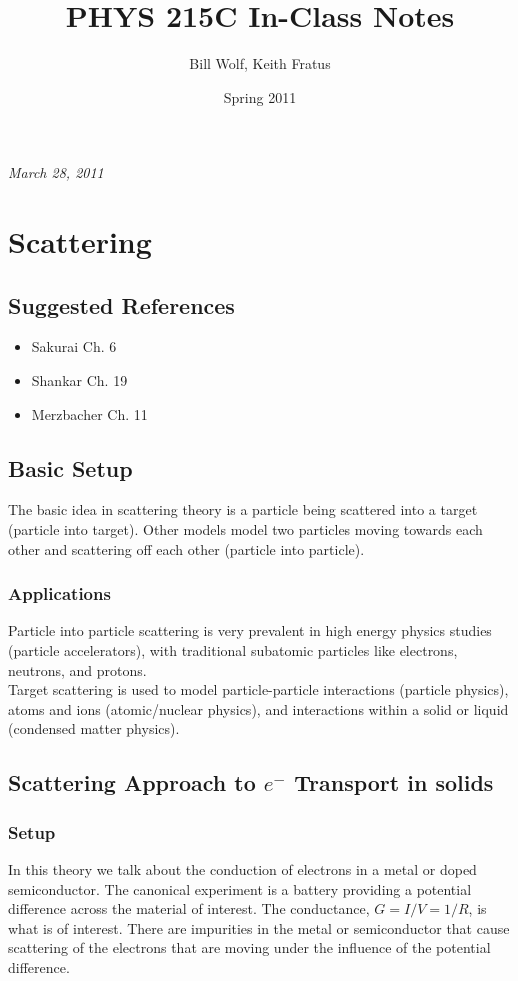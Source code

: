 \documentclass{article}
\title{PHYS 215C In-Class Notes}
\author{Bill Wolf, Keith Fratus}
\date{Spring 2011}
\begin{document}
\maketitle \newpage{}
\tableofcontents
 \newpage{}
		\textit{March 28, 2011}	
	\section{Scattering}
		\subsection{Suggested References}
		\begin{itemize}
			\item Sakurai Ch. 6
			\item Shankar Ch. 19
			\item Merzbacher Ch. 11
		\end{itemize}
		\subsection{Basic Setup}
		The basic idea in scattering theory is a particle being scattered into a target (particle into target). Other models model two particles moving towards each other and scattering off each other (particle into particle).
		\subsubsection{Applications}
		Particle into particle scattering is very prevalent in high energy physics studies (particle accelerators), with traditional subatomic particles like electrons, neutrons, and protons.\\
		
		\noindent Target scattering is used to model particle-particle interactions (particle physics), atoms and ions (atomic/nuclear physics), and interactions within a solid or liquid (condensed matter physics).
		
		\subsection{Scattering Approach to ${e^-}$ Transport in solids}
		\subsubsection{Setup}
		In this theory we talk about the conduction of electrons in a metal or doped semiconductor. The canonical experiment is a battery providing a potential difference across the material of interest. The conductance, $G=I/V=1/R$, is what is of interest. There are impurities in the metal or semiconductor that cause scattering of the electrons that are moving under the influence of the potential difference.
\end{document}
